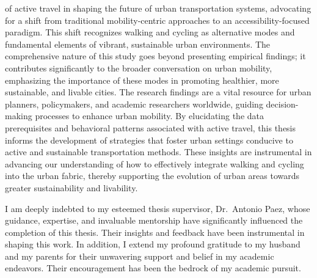 \documentclass[
11pt, %
oneside, %
english, %
singlespacing, %
]{macthesis} %
\def\blankpage{%
      \clearpage%
      \thispagestyle{empty}%
      \addtocounter{page}{-1}%
      \null%
      \clearpage}
\begin{document}
of active travel in shaping the future of urban transportation systems, advocating for a shift from traditional mobility-centric approaches to an accessibility-focused paradigm. This shift recognizes walking and cycling as alternative modes and fundamental elements of vibrant, sustainable urban environments. The comprehensive nature of this study goes beyond presenting empirical findings; it contributes significantly to the broader conversation on urban mobility, emphasizing the importance of these modes in promoting healthier, more sustainable, and livable cities. The research findings are a vital resource for urban planners, policymakers, and academic researchers worldwide, guiding decision-making processes to enhance urban mobility. By elucidating the data prerequisites and behavioral patterns associated with active travel, this thesis informs the development of strategies that foster urban settings conducive to active and sustainable transportation methods. These insights are instrumental in advancing our understanding of how to effectively integrate walking and cycling into the urban fabric, thereby supporting the evolution of urban areas towards greater sustainability and livability.
\blankpage
\clearpage


  \begin{acknowledgements}
  \addchaptertocentry{\acknowledgementname} %
    I am deeply indebted to my esteemed thesis supervisor, Dr.~Antonio Paez, whose guidance, expertise, and invaluable mentorship have significantly influenced the completion of this thesis. Their insights and feedback have been instrumental in shaping this work. In addition, I extend my profound gratitude to my husband and my parents for their unwavering support and belief in my academic endeavors. Their encouragement has been the bedrock of my academic pursuit.
  \end{acknowledgements}
\blankpage
\clearpage


\tableofcontents %
\end{document}
